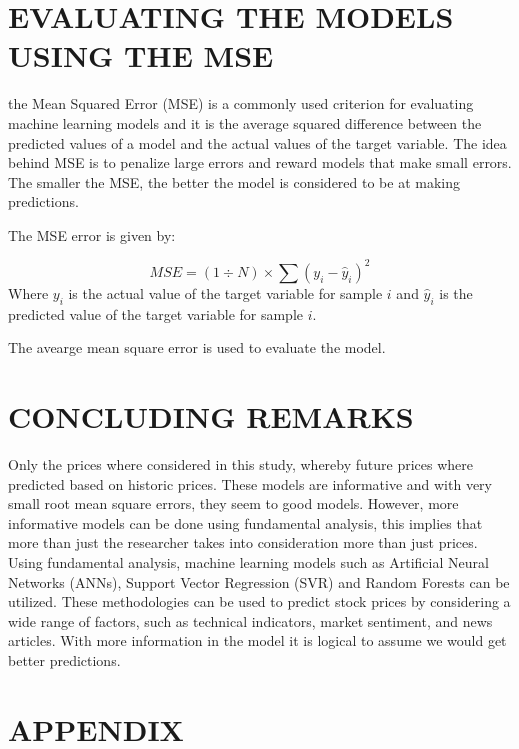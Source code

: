 \documentclass[
]{article}
\begin{document}
\hypertarget{evaluating-the-models-using-the-mse}{%
\section{EVALUATING THE MODELS USING THE
MSE}\label{evaluating-the-models-using-the-mse}}

the Mean Squared Error (MSE) is a commonly used criterion for evaluating
machine learning models and it is the average squared difference between
the predicted values of a model and the actual values of the target
variable. The idea behind MSE is to penalize large errors and reward
models that make small errors. The smaller the MSE, the better the model
is considered to be at making predictions.

The MSE error is given by:

\[MSE = (1\div{N})\times\sum(y_i - \hat{y}_i)^2\] Where \(y_i\) is the
actual value of the target variable for sample \(i\) and \(\hat{y}_i\)
is the predicted value of the target variable for sample \(i\).

The avearge mean square error is used to evaluate the model.

\hypertarget{concluding-remarks}{%
\section{CONCLUDING REMARKS}\label{concluding-remarks}}

Only the prices where considered in this study, whereby future prices
where predicted based on historic prices. These models are informative
and with very small root mean square errors, they seem to good models.
However, more informative models can be done using fundamental analysis,
this implies that more than just the researcher takes into consideration
more than just prices. Using fundamental analysis, machine learning
models such as Artificial Neural Networks (ANNs), Support Vector
Regression (SVR) and Random Forests can be utilized. These methodologies
can be used to predict stock prices by considering a wide range of
factors, such as technical indicators, market sentiment, and news
articles. With more information in the model it is logical to assume we
would get better predictions.

\newpage

\hypertarget{appendix}{%
\section{APPENDIX}\label{appendix}}
\end{document}
